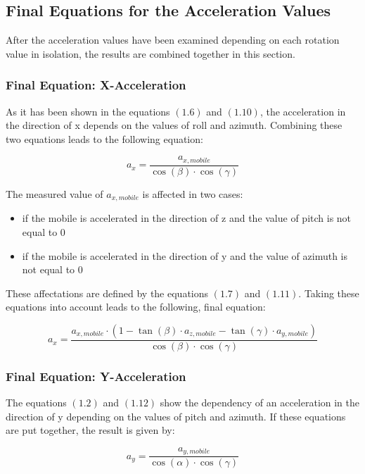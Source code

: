 \documentclass[12pt, a4paper, oneside, british]{article}
\begin{document}
\subsection{Final Equations for the Acceleration Values}
After the acceleration values have been examined depending on each rotation
value in isolation, the results are combined together in this section.

\subsubsection{Final Equation: X-Acceleration }
As it has been shown in the equations $(1.6)$ and $(1.10)$, the acceleration in
the direction of x depends on the values of roll and azimuth. Combining these
two equations leads to the following equation:

\begin{equation}
a_x = \frac{a_{x, mobile}}{\cos(\beta) \cdot \cos(\gamma)}
\end{equation}

\noindent The measured value of $a_{x,mobile}$ is affected in two cases:
\begin{itemize}
\item{if the mobile is accelerated in the direction of z and the value of pitch is not equal to 0}
\item{if the mobile is accelerated in the direction of y and the value of azimuth is not equal to 0}
\end{itemize}
These affectations are defined by the equations $(1.7)$ and $(1.11)$. Taking
these equations into account leads to the following, final equation:

\begin{equation}
a_x = \frac{a_{x, mobile} \cdot (1 - \tan(\beta) \cdot a_{z, mobile}
- \tan(\gamma) \cdot a_{y, mobile})}{\cos(\beta) \cdot \cos(\gamma)}
\end{equation}

\subsubsection{Final Equation: Y-Acceleration }
The equations $(1.2)$ and $(1.12)$ show the dependency of an acceleration in the
direction of y depending on the values of pitch and azimuth. If these equations
are put together, the result is given by:

\begin{equation}
a_y = \frac{a_{y, mobile}}{\cos(\alpha) \cdot \cos(\gamma)}
\end{equation}
\end{document}
